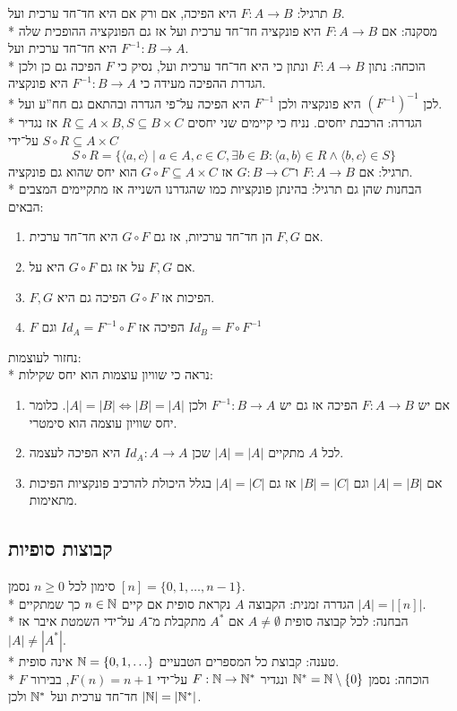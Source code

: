 תרגיל: $F : A \to B$ היא הפיכה, אם ורק אם היא חד־חד ערכית ועל $B$. \\*
מסקנה: אם $F : A \to B$ היא פונקציה חד־חד ערכית ועל אז גם הפונקציה ההופכית שלה $F^{-1} : B \to A$ היא חד־חד ערכית ועל. \\*
הוכחה: נתון $F : A \to B$ ונתון כי היא חד־חד ערכית ועל, נסיק כי $F$ הפיכה גם כן ולכן הגדרת ההפיכה מעידה כי $F^{-1} : B \to A$ היא פונקציה. \\*
לכן ${(F^{-1})}^{-1}$ היא פונקציה ולכן $F^{-1}$ היא הפיכה על־פי הגדרה ובהתאם גם חח''ע ועל. \\*
הגדרה: הרכבת יחסים. נניח כי קיימים שני יחסים $R \subseteq A \times B, S \subseteq B \times C$ אז נגדיר $S \circ R \subseteq A \times C$ על־ידי
\[
	S \circ R = \{ \langle a, c \rangle \mid a \in A, c \in C, \exists b \in B : \langle a, b \rangle \in R \land \langle b, c \rangle \in S \}
\]
תרגיל: אם $F : A \to B$ ו־$G : B \to C$ אז $G \circ F \subseteq A \times C$ הוא יחס שהוא גם פונקציה. \\*
הבחנות שהן גם תרגיל: בהינתן פונקציות כמו שהגדרנו השנייה אז מתקיימים המצבים הבאים:
\begin{enumerate}
	\item אם $F, G$ הן חד־חד ערכיות, אז גם $G \circ F$ היא חד־חד ערכית.
	\item אם $F, G$ על אז גם $G \circ F$ היא על.
	\item $F, G$ הפיכות אז $G \circ F$ הפיכה גם היא.
	\item $F$ הפיכה אז $Id_A = F^{-1} \circ F$ וגם $Id_B = F \circ F^{-1}$
\end{enumerate}
נחזור לעוצמות: \\*
נראה כי שוויון עוצמות הוא יחס שקילות:
\begin{enumerate}
	\item אם יש $F: A \to B$ הפיכה אז גם יש $F^{-1} : B \to A$ ולכן $|A| = |B| \iff |B| = |A|$. כלומר יחס שוויון עוצמה הוא סימטרי.
	\item לכל $A$ מתקיים $|A| = |A|$ שכן $Id_A : A \to A$ היא הפיכה לעצמה.
	\item אם $|A| = |B|$ וגם $|B| = |C|$ אז גם $|A| = |C|$ בגלל היכולת להרכיב פונקציות הפיכות מתאימות.
\end{enumerate}

\subsection{קבוצות סופיות}
סימון לכל $n \ge 0$ נסמן $[n] = \{0, 1, \hdots, n - 1 \}$. \\*
הגדרה זמנית: הקבוצה $A$ נקראת סופית אם קיים $n \in \mathbb{N}$ כך שמתקיים $|A| = |[n]|$. \\*
הבחנה: לכל קבוצה סופית $A \ne \emptyset$ אם $A^*$ מתקבלת מ־$A$ על־ידי השמטת איבר אז $|A| \ne |A^*|$. \\*
טענה: קבוצת כל המספרים הטבעיים $\mathbb{N} = \{0, 1, \hdots\}$ אינה סופית. \\*
הוכחה: נסמן $\mathbb{N}^* = \mathbb{N}\setminus\{0\}$ ונגדיר $F : \mathbb{N} \to \mathbb{N}^*$ על־ידי $F(n) = n + 1$, בבירור $F$ חד־חד ערכית ועל $\mathbb{N}^*$ ולכן $|\mathbb{N}| = |\mathbb{N}^*|$.

